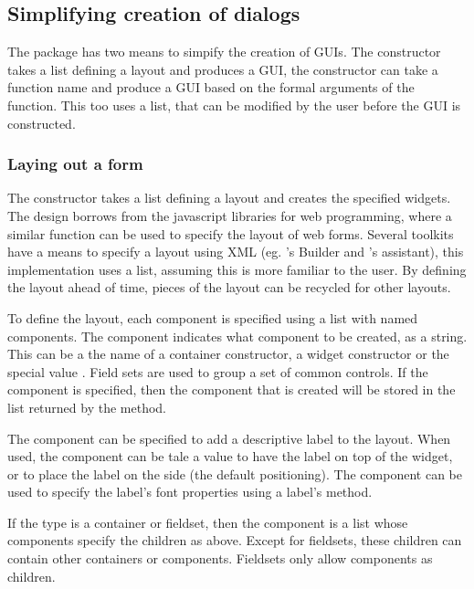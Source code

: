 \subsection{Simplifying creation of dialogs}
\label{sec:gWidgets-designing-forms}

The  package has two means to simpify the creation of
GUIs. The  constructor takes a list defining a
layout and produces a GUI, the  constructor can
take a function name and produce a GUI based on the formal arguments
of the function. This too uses a list, that can be modified by the
user before the GUI is constructed. 

\subsubsection{Laying out a form}
\label{sec:gWidgets-laying-out-form}

The  constructor takes a list defining a
layout and creates the specified widgets. The design borrows from the
 javascript libraries for web programming, where a similar
function can be used to specify the layout of web forms. Several
toolkits have a means to specify a layout using XML (eg. \GTK's
Builder and \Qt's assistant), this implementation uses a list,
assuming this is more familiar to the \R\/ user. By defining the
layout ahead of time, pieces of the layout can be recycled for other
layouts.


To define the layout, each component is specified using a list with
named components. The component  indicates what component
to be created, as a string. This can be a the name of a container
constructor, a widget constructor or the special value
. Field sets are used to group a set of common
controls. If the component  is specified, then the
component that is created will be stored in the list returned by the
\code{[} method.

The  component can be specified to
add a descriptive label to the layout. When used, the component
 can be tale a value  to have the label
on top of the widget, or  to place the label on the side
(the default positioning). The  component can be used
to specify the label's font properties using a label's  method.

If the type is a container or fieldset, then the 
component is a list whose components specify the children as
above. Except for fieldsets, these children can contain other
containers or components. Fieldsets only allow components as children.

